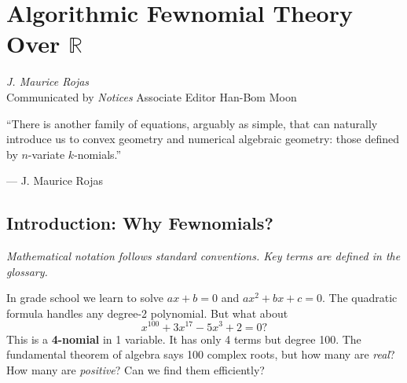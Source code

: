 \chapter{Algorithmic Fewnomial Theory Over \texorpdfstring{$\mathbb{R}$}{R}}
\label{ch:fewnomials}
\cite{rojas2025fewnomial}

\begin{flushright}
\textit{J. Maurice Rojas}\\
Communicated by \textit{Notices} Associate Editor Han-Bom Moon
\end{flushright}

\epigraph{``There is another family of equations, arguably as simple, that can naturally introduce us to convex geometry and numerical algebraic geometry: those defined by $n$-variate $k$-nomials.''}{--- J. Maurice Rojas}

\begin{abstract}
A \textbf{fewnomial} is a polynomial with few monomial terms relative to its degree. While classical algebraic geometry focuses on dense polynomials, fewnomials arise naturally in chemical reaction networks, power systems, neural network verification, and optimization. This chapter develops the theory of fewnomials: root counting via tropical geometry, the Kushnirenko-Bernstein theorem, and algorithmic approaches that exploit sparsity to solve systems far beyond the reach of dense methods, \cite{rojas2025fewnomial}.
\end{abstract}

\section{Introduction: Why Fewnomials?}

\noindent\textit{Mathematical notation follows standard conventions. Key terms are defined in the glossary.}\n
\label{sec:few:intro}

In grade school we learn to solve $ax+b=0$ and $ax^2+bx+c=0$. The quadratic formula handles any degree-2 polynomial. But what about
\[
x^{100} + 3x^{17} - 5x^3 + 2 = 0 ?
\]
This is a \textbf{4-nomial} in 1 variable. It has only 4 terms but degree 100. The fundamental theorem of algebra says 100 complex roots, but how many are \emph{real}? How many are \emph{positive}? Can we find them efficiently?

